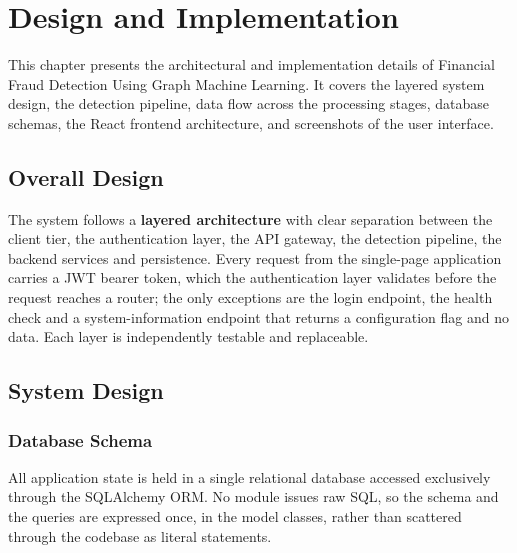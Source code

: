 \chapter{Design and Implementation}

This chapter presents the architectural and implementation details of Financial Fraud Detection Using Graph Machine Learning. It covers the layered system design, the detection pipeline, data flow across the processing stages, database schemas, the React frontend architecture, and screenshots of the user interface.

\section{Overall Design}
The system follows a \textbf{layered architecture} with clear separation between the client tier, the authentication layer, the API gateway, the detection pipeline, the backend services and persistence. Every request from the single-page application carries a JWT bearer token, which the authentication layer validates before the request reaches a router; the only exceptions are the login endpoint, the health check and a system-information endpoint that returns a configuration flag and no data. Each layer is independently testable and replaceable.

\section{System Design}

\subsection{Database Schema}
All application state is held in a single relational database accessed exclusively through the SQLAlchemy ORM. No module issues raw SQL, so the schema and the queries are expressed once, in the model classes, rather than scattered through the codebase as literal statements.

